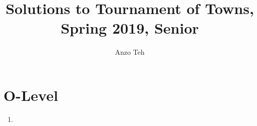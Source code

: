 \documentclass[11pt,a4paper]{article}
\begin{document}
\newcommand{\la}{\leftarrow}
\newcommand{\lra}{\leftrightarrow}
\newcommand{\bbN}{\mathbb{N}}
\newcommand{\bbZ}{\mathbb{Z}}
\newcommand{\dsum}{\displaystyle\sum}
\newcommand{\dprod}{\displaystyle\prod}


\title{Solutions to Tournament of Towns, Spring 2019, Senior}
\author{Anzo Teh}
\date{}
\maketitle

\section*{O-Level}
\begin{enumerate}
	\item
\end{enumerate}
\end{document}
